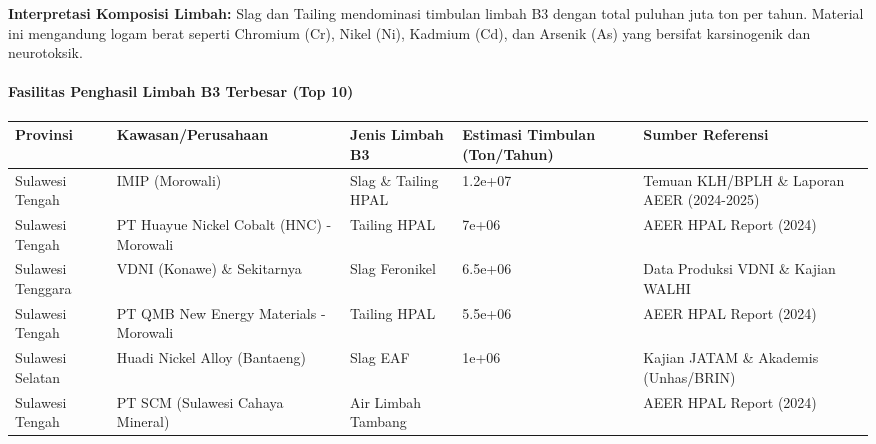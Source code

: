 \documentclass[
]{article}
\newcounter{none} %
\begin{document}
\textbf{Interpretasi Komposisi Limbah:} Slag dan Tailing mendominasi
timbulan limbah B3 dengan total puluhan juta ton per tahun. Material ini
mengandung logam berat seperti Chromium (Cr), Nikel (Ni), Kadmium (Cd),
dan Arsenik (As) yang bersifat karsinogenik dan neurotoksik.

\paragraph{Fasilitas Penghasil Limbah B3 Terbesar (Top
10)}\label{fasilitas-penghasil-limbah-b3-terbesar-top-10}

{\def\LTcaptype{none} %
\begin{longtable}[]{@{}
  >{\raggedright\arraybackslash}p{}
  >{\raggedright\arraybackslash}p{}
  >{\raggedright\arraybackslash}p{}
  >{\raggedleft\arraybackslash}p{}
  >{\raggedright\arraybackslash}p{}@{}}
\toprule\noalign{}
\begin{minipage}[b]{\linewidth}\raggedright
Provinsi
\end{minipage} & \begin{minipage}[b]{\linewidth}\raggedright
Kawasan/Perusahaan
\end{minipage} & \begin{minipage}[b]{\linewidth}\raggedright
Jenis Limbah B3
\end{minipage} & \begin{minipage}[b]{\linewidth}\raggedleft
Estimasi Timbulan (Ton/Tahun)
\end{minipage} & \begin{minipage}[b]{\linewidth}\raggedright
Sumber Referensi
\end{minipage} \\
\midrule\noalign{}
\endhead
\bottomrule\noalign{}
\endlastfoot
Sulawesi Tengah & IMIP (Morowali) & Slag \& Tailing HPAL & 1.2e+07 &
Temuan KLH/BPLH \& Laporan AEER (2024-2025) \\
Sulawesi Tengah & PT Huayue Nickel Cobalt (HNC) - Morowali & Tailing
HPAL & 7e+06 & AEER HPAL Report (2024) \\
Sulawesi Tenggara & VDNI (Konawe) \& Sekitarnya & Slag Feronikel &
6.5e+06 & Data Produksi VDNI \& Kajian WALHI \\
Sulawesi Tengah & PT QMB New Energy Materials - Morowali & Tailing HPAL
& 5.5e+06 & AEER HPAL Report (2024) \\
Sulawesi Selatan & Huadi Nickel Alloy (Bantaeng) & Slag EAF & 1e+06 &
Kajian JATAM \& Akademis (Unhas/BRIN) \\
Sulawesi Tengah & PT SCM (Sulawesi Cahaya Mineral) & Air Limbah Tambang
& 800000 & AEER HPAL Report (2024) \\
\end{longtable}
}
\end{document}
